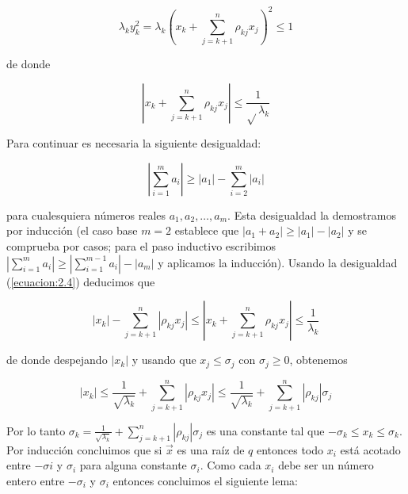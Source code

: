 \begin{equation*}
\lambda_{k}y_{k}^{2} = \lambda_{k}\left(x_{k} + \sum_{j=k+1}^{n}\rho_{kj}x_{j}\right)^{2} \leq 1
\end{equation*} 

de donde 

\begin{equation*}
\left|x_{k} + \sum_{j=k+1}^{n} \rho_{kj} x_{j}\right| \leq \frac{1}{\sqrt{}\lambda_{k}}
\end{equation*} 

Para continuar es necesaria la siguiente desigualdad:

\begin{equation}
\left|\sum_{i=1}^{m} a_{i}\right| \geq \left|a_{1}\right| - \sum_{i=2}^{m}\left|a_{i}\right|
\label{ecuacion:2.4}
\end{equation} 

para cualesquiera números reales $a_{1}, a_{2}, \ldots, a_{m}$. Esta desigualdad la demostramos por inducción (el caso base $m=2$ establece que $\left|a_{1} + a_{2}\right| \geq \left|a_{1}\right| - \left|a_{2}\right|$ y se comprueba por casos; para el paso inductivo escribimos $\left|\sum_{i=1}^{m}a_{i}\right| \geq \left|\sum_{i=1}^{m-1}a_{i}\right| - \left|a_{m}\right|$ y aplicamos la inducción). Usando la desigualdad (\ref{ecuacion:2.4}) deducimos que 

\begin{equation*}
\left|x_{k}\right| - \sum_{j=k+1}^{n}\left| \rho_{kj}x_{j}\right| \leq \left|x_{k} + \sum_{j=k+1}^{n}\rho_{kj}x_{j}\right| \leq \frac{1}{\lambda_{k}}
\end{equation*} 

de donde despejando $\left|x_{k}\right|$ y usando que $x_{j} \leq \sigma_{j}$ con $\sigma_{j} \geq 0$, obtenemos

\begin{equation*}
\left|x_{k}\right| \leq \frac{1}{\sqrt{\lambda_{k}}} + \sum_{j=k+1}^{n}\left| \rho_{kj}x_{j}\right| \leq \frac{1}{\sqrt{\lambda_{k}}} + \sum_{j=k+1}^{n}\left|\rho_{kj}\right|\sigma_{j}
\end{equation*} 

Por lo tanto $\sigma_{k} = \frac{1}{\sqrt{\lambda_{k}}} + \sum_{j=k+1}^{n}\left|\rho_{kj}\right|\sigma_{j}$ es una constante tal que $-\sigma_{k} \leq x_{k} \leq \sigma_{k}$. Por inducción concluimos que si $\overrightarrow{x}$ es una raíz de $q$ entonces todo $x_{i}$ está acotado entre $-\sigma{i}$ y $\sigma_{i}$ para alguna constante $\sigma_{i}$. Como cada $x_{i}$ debe ser un número entero entre $-\sigma_{i}$ y $\sigma_{i}$ entonces concluimos el siguiente lema:

